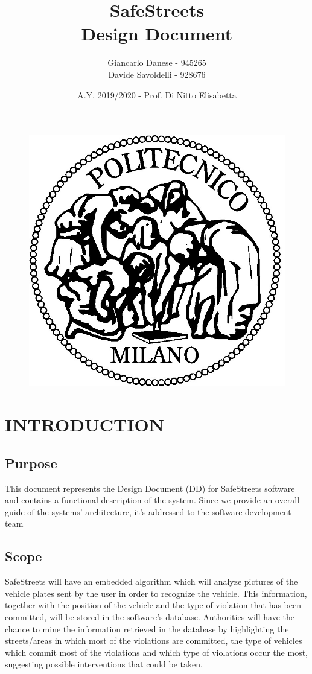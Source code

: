\documentclass[12pt,a4paper]{article}
\author{Giancarlo Danese - 945265\\
	Davide Savoldelli - 928676}
\date{A.Y. 2019/2020 - Prof. Di Nitto Elisabetta}
\title{
	\textbf{\Huge{SafeStreets}} \\
	\large Design Document
}
\begin{document}
	\begin{figure}
		\centering
		\includegraphics[width=1.0\linewidth]{assets/images/logo_poli.jpg}
	\end{figure}

	\maketitle
	\newpage
	\tableofcontents
	\newpage

\section{INTRODUCTION}
\subsection{Purpose}
This document represents the Design Document (DD) for SafeStreets software and contains a functional description of the system. Since we provide an overall guide of the systems' architecture, it's addressed to the software development team
\subsection{Scope}
SafeStreets will have an embedded algorithm which will analyze pictures of the vehicle plates sent by the user in order to recognize the vehicle. This information, together with the position of the vehicle and the type of violation that has been committed, will be stored in the software's database.
\newline
Authorities will have the chance to mine the information retrieved in the database by highlighting the streets/areas in which most of the violations are committed, the type of vehicles which commit most of the violations and which type of violations occur the most, suggesting possible interventions that could be taken.	
\end{document}
